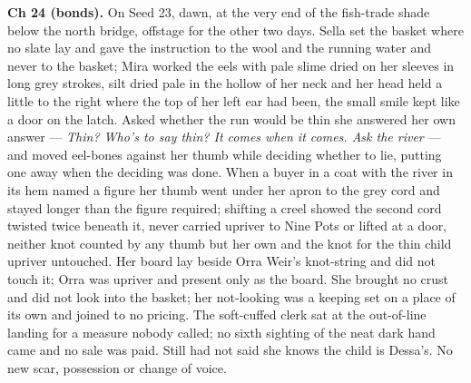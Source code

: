 \documentclass{design/chronicle}
\begin{document}
{\textbf{Ch 24 (bonds).} On Seed 23, dawn, at the very end of the fish-trade shade below the north bridge, offstage for the other two days. Sella set the basket where no slate lay and gave the instruction to the wool and the running water and never to the basket; Mira worked the eels with pale slime dried on her sleeves in long grey strokes, silt dried pale in the hollow of her neck and her head held a little to the right where the top of her left ear had been, the small smile kept like a door on the latch. Asked whether the run would be thin she answered her own answer — \emph{Thin? Who’s to say thin? It comes when it comes. Ask the river} — and moved eel-bones against her thumb while deciding whether to lie, putting one away when the deciding was done. When a buyer in a coat with the river in its hem named a figure her thumb went under her apron to the grey cord and stayed longer than the figure required; shifting a creel showed the second cord twisted twice beneath it, never carried upriver to Nine Pots or lifted at a door, neither knot counted by any thumb but her own and the knot for the thin child upriver untouched. Her board lay beside Orra Weir’s knot-string and did not touch it; Orra was upriver and present only as the board. She brought no crust and did not look into the basket; her not-looking was a keeping set on a place of its own and joined to no pricing. The soft-cuffed clerk sat at the out-of-line landing for a measure nobody called; no sixth sighting of the neat dark hand came and no sale was paid. Still had not said she knows the child is Dessa’s. No new scar, possession or change of voice.

}
\end{document}
